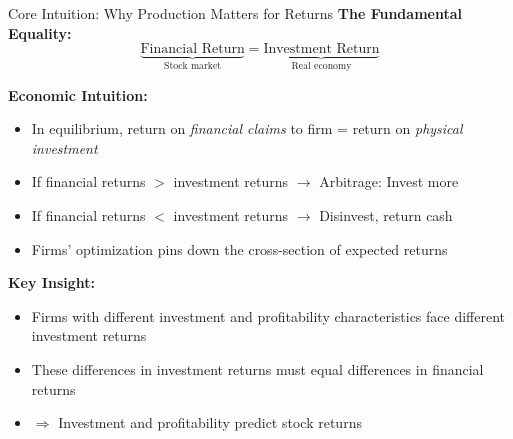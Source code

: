 \documentclass{beamer}
\begin{document}
\begin{frame}{Core Intuition: Why Production Matters for Returns}
    \textbf{The Fundamental Equality:}
    \begin{equation*}
        \underbrace{\text{Financial Return}}_{\text{Stock market}} = \underbrace{\text{Investment Return}}_{\text{Real economy}}
    \end{equation*}
    
    
    \textbf{Economic Intuition:}
    \begin{itemize}
        \item In equilibrium, return on \textit{financial claims} to firm = return on \textit{physical investment}
        \item If financial returns $>$ investment returns $\rightarrow$ Arbitrage: Invest more
        \item If financial returns $<$ investment returns $\rightarrow$ Disinvest, return cash
        \item Firms' optimization pins down the cross-section of expected returns
    \end{itemize}
    
    
    \textbf{Key Insight:}
    \begin{itemize}
        \item Firms with different investment and profitability characteristics face different investment returns
        \item These differences in investment returns must equal differences in financial returns
        \item $\Rightarrow$ Investment and profitability predict stock returns
    \end{itemize}
\end{frame}
\end{document}
